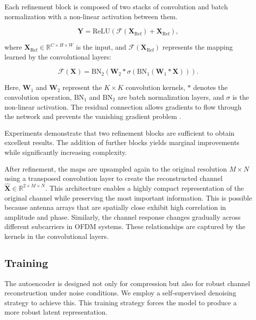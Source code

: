 Each refinement block is composed of two stacks of convolution and batch normalization with a non-linear activation between them.

\begin{equation}
    \mathbf{Y} = \text{ReLU} \left( \mathcal{F} \left( \mathbf{X}_{\text{Ref}} \right) + \mathbf{X}_{\text{Ref}} \right),
\end{equation}

where $\mathbf{X}_{\text{Ref}} \in \mathbb{R}^{C \times H \times W}$ is the input, and $\mathcal{F} \left( \mathbf{X}_{\text{Ref}} \right)$ represents the mapping learned by the convolutional layers:

\begin{equation}
    \mathcal{F}(\mathbf{X}) = \text{BN}_2\left( \mathbf{W}_2 * \sigma\left( \text{BN}_1\left( \mathbf{W}_1 * \mathbf{X} \right) \right) \right).
\end{equation}

Here, $\mathbf{W}_1$ and $\mathbf{W}_2$ represent the $K \times K$ convolution kernels, $*$ denotes the convolution operation, $\text{BN}_1$ and $\text{BN}_2$ are batch normalization layers, and $\sigma$ is the non-linear activation. 
The residual connection allows gradients to flow through the network and prevents the vanishing gradient problem \cite{he2016deep}.

Experiments demonstrate that two refinement blocks are sufficient to obtain excellent results. The addition of further blocks yields marginal improvements while significantly increasing complexity.

After refinement, the maps are upsampled again to the original resolution $M \times N$ using a transposed convolution layer to create the reconstructed channel $\hat{\mathbf{X}} \in \mathbb{R}^{2 \times M \times N}$. This architecture enables a highly compact representation of the original channel while preserving the most important information. This is possible because antenna arrays that are spatially close exhibit high correlation in amplitude and phase. Similarly, the channel response changes gradually across different subcarriers in OFDM systems. These relationships are captured by the kernels in the convolutional layers.

\subsection{Training}\label{sec:autoencoder_training}

The autoencoder is designed not only for compression but also for robust channel reconstruction under noise conditions. We employ a self-supervised denoising strategy to achieve this.
This training strategy forces the model to produce a more robust latent representation.

